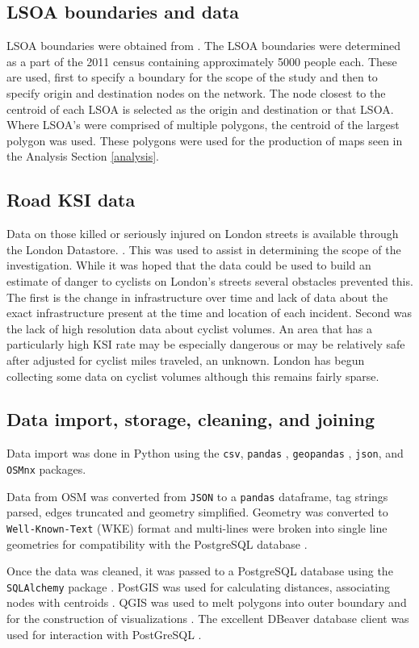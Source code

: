 \subsection{LSOA boundaries and data}
	
LSOA boundaries were obtained from  \textcite{lsoageoms}. The LSOA boundaries were determined as a part of the 2011 census containing approximately 5000 people each. These are used, first to specify a boundary for the scope of the study and then to specify origin and destination nodes on the network. The node closest to the centroid of each LSOA is selected as the origin and destination or that LSOA. Where LSOA's were comprised of multiple polygons, the centroid of the largest polygon was used. These polygons were used for the production of maps seen in the Analysis Section \ref{analysis}. 
	
\subsection{Road KSI data}

Data on those killed or seriously injured on London streets is available through the London Datastore. \parencite{cyclistksi}. This was used to assist in determining the scope of the investigation. While it was hoped that the data could be used to build an estimate of danger to cyclists on London's streets several obstacles prevented this. The first is the change in infrastructure over time and lack of data about the exact infrastructure present at the time and location of each incident. Second was the lack of high resolution data about cyclist volumes. An area that has a particularly high KSI rate may be especially dangerous or may be relatively safe after adjusted for cyclist miles traveled, an unknown. London has begun collecting some data on cyclist volumes although this remains fairly sparse. 
	
\subsection{Data import, storage, cleaning, and joining}

Data import was done in Python \parencite{python} using the \texttt{csv}, \texttt{pandas} \parencite{pandas}, \texttt{geopandas} \parencite{geopandas}, \texttt{json}, and \texttt{OSMnx} \parencite{osmnx} packages. 

Data from OSM was converted from \texttt{JSON} to a \texttt{pandas} dataframe, tag strings parsed, edges truncated and geometry simplified. Geometry was converted to \texttt{Well-Known-Text} (WKE) format and multi-lines were broken into single line geometries for compatibility with the PostgreSQL database \parencite{postgres}. 

Once the data was cleaned, it was passed to a PostgreSQL database using the \texttt{SQLAlchemy} package \parencite{bayer2010sqlalchemy}. PostGIS was used for calculating distances, associating nodes with centroids \parencite{postgis}. QGIS was used to melt polygons into outer boundary and for the construction of visualizations \parencite{qgis}. The excellent DBeaver database client was used for interaction with PostGreSQL \parencite{dbeaver}.